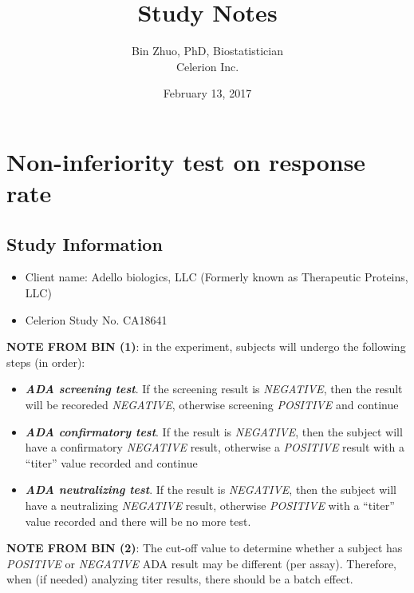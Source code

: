 \documentclass[]{article}
\title{Study Notes}
\author{Bin Zhuo, PhD, Biostatistician\\
Celerion Inc.}
\date{February 13, 2017}
\providecommand{\tightlist}{%
  \setlength{\itemsep}{0pt}\setlength{\parskip}{0pt}}
\begin{document}
\maketitle

{
\hypersetup{linkcolor=black}
\setcounter{tocdepth}{2}
\tableofcontents
}
\newpage

\section{Non-inferiority test on response
rate}\label{non-inferiority-test-on-response-rate}

\subsection{Study Information}\label{study-information}

\begin{itemize}
\tightlist
\item
  Client name: Adello biologics, LLC (Formerly known as Therapeutic
  Proteins, LLC)
\item
  Celerion Study No. CA18641
\end{itemize}

\textbf{NOTE FROM BIN (1)}: in the experiment, subjects will undergo the
following steps (in order):

\begin{itemize}
\tightlist
\item
  \textbf{\emph{ADA screening test}}. If the screening result is
  \emph{NEGATIVE}, then the result will be recoreded \emph{NEGATIVE},
  otherwise screening \emph{POSITIVE} and continue
\item
  \textbf{\emph{ADA confirmatory test}}. If the result is
  \emph{NEGATIVE}, then the subject will have a confirmatory
  \emph{NEGATIVE} result, otherwise a \emph{POSITIVE} result with a
  ``titer'' value recorded and continue
\item
  \textbf{\emph{ADA neutralizing test}}. If the result is
  \emph{NEGATIVE}, then the subject will have a neutralizing
  \emph{NEGATIVE} result, otherwise \emph{POSITIVE} with a ``titer''
  value recorded and there will be no more test.
\end{itemize}

\textbf{NOTE FROM BIN (2)}: The cut-off value to determine whether a
subject has \emph{POSITIVE} or \emph{NEGATIVE} ADA result may be
different (per assay). Therefore, when (if needed) analyzing titer
results, there should be a batch effect.
\end{document}
